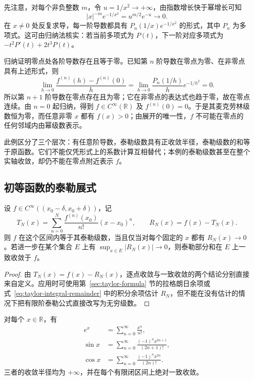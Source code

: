 \documentclass[UTF8,12pt,a4paper,fontset=fandol]{ctexbook}
\begin{document}
\begin{solve}
先注意，对每个非负整数 $m$，令 $u=1/x^2\to+\infty$，由指数增长快于幂增长可知
\[
    |x|^{-m}e^{-1/x^2}=u^{m/2}e^{-u}\longrightarrow0.
\]
在 $x\neq0$ 处反复求导，每一阶导数都具有 $P_n(1/x)e^{-1/x^2}$ 的形式，其中 $P_n$ 为多项式。这可由归纳法核实：若当前多项式为 $P(t)$，下一阶对应多项式为 $-t^2P'(t)+2t^3P(t)$。

归纳证明零点处各阶导数存在且等于零。已知第 $n$ 阶导数在零点为零、在非零点具有上述形式，则
\[
    \lim_{h\to0}\frac{f^{(n)}(h)-f^{(n)}(0)}h
       =\lim_{h\to0}\frac{P_n(1/h)}h e^{-1/h^2}=0.
\]
所以第 $n+1$ 阶导数在零点存在且为零；它在非零点的表达式也趋于零，故在零点连续。由 $n=0$ 起归纳，得到 $f\in C^\infty(\mathbb R)$ 及 $f^{(n)}(0)=0$。于是其麦克劳林级数恒为零，而任意非零 $x$ 都有 $f(x)>0$；由展开的唯一性，$f$ 不可能在零点的任何邻域内由幂级数表示。
\end{solve}

此例区分了三个层次：有任意阶导数，泰勒级数具有正收敛半径，泰勒级数的和等于原函数。它们不能仅凭形式上的系数计算互相替代；本例的泰勒级数甚至在整个实轴收敛，却仍不能在零点附近表示 $f$。

\subsection{初等函数的泰勒展式}
\label{subsec:taylor-expansions-of-elementary-functions}

\begin{theorem}[泰勒展开的余项判据]
\label{thm:taylor-expansion-remainder-criterion}
设 $f\in C^\infty((x_0-\delta,x_0+\delta))$，记
\[
    T_N(x)=\sum_{n=0}^N\frac{f^{(n)}(x_0)}{n!}(x-x_0)^n,
    \qquad R_N(x)=f(x)-T_N(x).
\]
则 $f$ 在这个区间内等于其泰勒级数，当且仅当对每个固定的 $x$ 都有 $R_N(x)\to0$。若进一步在某个集合 $E$ 上有 $\sup_{x\in E}|R_N(x)|\to0$，则泰勒部分和在 $E$ 上一致收敛于 $f$。
\end{theorem}

\begin{proof}
由 $T_N(x)=f(x)-R_N(x)$，逐点收敛与一致收敛的两个结论分别直接来自定义。应用时可使用第~\ref{sec:taylor-formula} 节的拉格朗日余项或式~\eqref{eq:taylor-integral-remainder} 中的积分余项估计 $R_N$，但不能在没有估计的情况下把有限阶泰勒公式直接改写为无穷级数。
\end{proof}

\begin{proposition}[指数、正弦与余弦的展开]
\label{prop:exponential-sine-cosine-power-expansions}
对每个 $x\in\mathbb R$，有
\begin{align}
    e^x&=\sum_{n=0}^\infty\frac{x^n}{n!},
        \label{eq:exponential-maclaurin-expansion}\\
    \sin x&=\sum_{n=0}^\infty
        \frac{(-1)^nx^{2n+1}}{(2n+1)!},
        \label{eq:sine-maclaurin-expansion}\\
    \cos x&=\sum_{n=0}^\infty
        \frac{(-1)^nx^{2n}}{(2n)!}.
        \label{eq:cosine-maclaurin-expansion}
\end{align}
三者的收敛半径均为 $+\infty$，并在每个有限闭区间上绝对一致收敛。
\end{proposition}
\end{document}
